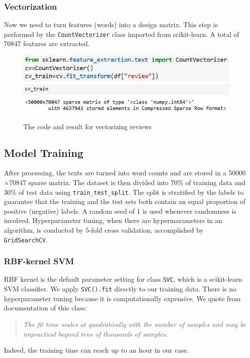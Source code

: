 \documentclass[10pt,twocolumn]{article}
\begin{document}
	\subsubsection{Vectorization}
	Now we need to turn features (words) into a design matrix. This step is performed by the \texttt{CountVectorizer} class imported from scikit-learn. A total of 70847 features are extracted.
	\begin{figure}[H]
		\includegraphics[width = \columnwidth]{vectorization}
		\includegraphics[width = \columnwidth]{vec_result}
		\caption{The code and result for vectorizing reviews}
	\end{figure}
	
	\subsection{Model Training}
	After processing, the texts are turned into word counts and are stored in a 50000$\times$70847 sparse matrix. The dataset is then divided into 70\% of training data and 30\% of test data using \texttt{train\_test\_split}. The split is stratified by the labels to guarantee that the training and the test sets both contain an equal proportion of positive (negative) labels. A random seed of 1 is used whenever randomness is involved. Hyperparameter tuning, when there are hypermarameters in an algorithm, is conducted by 5-fold cross validation, accomplished by \texttt{GridSearchCV}. 
	\subsubsection{RBF-kernel SVM}
	RBF kernel is the default parameter setting for class \texttt{SVC}, which is a scikit-learn SVM classifier. We apply \texttt{SVC().fit} directly to our training data. There is no hyperparameter tuning because it is computationally expensive. We quote from documentation of this class:
	\begin{quote}
		\itshape
		The fit time scales at quadratically with the number of samples and may be impractical beyond tens of thousands of samples.
	\end{quote} 
	Indeed, the training time can reach up to an hour in our case. 
\end{document}
